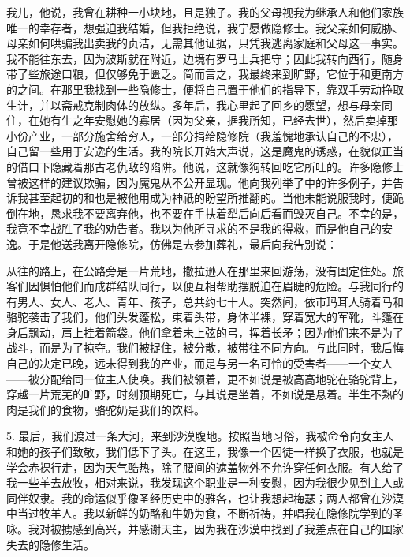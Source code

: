 我儿，他说，我曾在耕种一小块地，且是独子。我的父母视我为继承人和他们家族唯一的幸存者，想强迫我结婚，但我拒绝说，我宁愿做隐修士。我父亲如何威胁、母亲如何哄骗我出卖我的贞洁，无需其他证据，只凭我逃离家庭和父母这一事实。我不能往东去，因为波斯就在附近，边境有罗马士兵把守；因此我转向西行，随身带了些旅途口粮，但仅够免于匮乏。简而言之，我最终来到旷野，它位于和更南方的之间。在那里我找到一些隐修士，便将自己置于他们的指导下，靠双手劳动挣取生计，并以斋戒克制肉体的放纵。多年后，我心里起了回乡的愿望，想与母亲同住，在她有生之年安慰她的寡居（因为父亲，据我所知，已经去世），然后卖掉那小份产业，一部分施舍给穷人，一部分捐给隐修院（我羞愧地承认自己的不忠），自己留一些用于安逸的生活。我的院长开始大声说，这是魔鬼的诱惑，在貌似正当的借口下隐藏着那古老仇敌的陷阱。他说，这就像狗转回吃它所吐的。许多隐修士曾被这样的建议欺骗，因为魔鬼从不公开显现。他向我列举了中的许多例子，并告诉我甚至起初的和也是被他用成为神祇的盼望所推翻的。当他未能说服我时，便跪倒在地，恳求我不要离弃他，也不要在手扶着犁后向后看而毁灭自己。不幸的是，我竟不幸战胜了我的劝告者。我以为他所寻求的不是我的得救，而是他自己的安逸。于是他送我离开隐修院，仿佛是去参加葬礼，最后向我告别说：\par

从往的路上，在公路旁是一片荒地，撒拉逊人在那里来回游荡，没有固定住处。旅客们因惧怕他们而成群结队同行，以便互相帮助摆脱迫在眉睫的危险。与我同行的有男人、女人、老人、青年、孩子，总共约七十人。突然间，依市玛耳人骑着马和骆驼袭击了我们，他们头发蓬松，束着头带，身体半裸，穿着宽大的军靴，斗篷在身后飘动，肩上挂着箭袋。他们拿着未上弦的弓，挥着长矛；因为他们来不是为了战斗，而是为了掠夺。我们被捉住，被分散，被带往不同方向。与此同时，我后悔自己的决定已晚，远未得到我的产业，而是与另一名可怜的受害者——一个女人——被分配给同一位主人使唤。我们被领着，更不如说是被高高地驼在骆驼背上，穿越一片荒芜的旷野，时刻预期死亡，与其说是坐着，不如说是悬着。半生不熟的肉是我们的食物，骆驼奶是我们的饮料。\par

5. 最后，我们渡过一条大河，来到沙漠腹地。按照当地习俗，我被命令向女主人和她的孩子们致敬，我们低下了头。在这里，我像一个囚徒一样换了衣服，也就是学会赤裸行走，因为天气酷热，除了腰间的遮盖物外不允许穿任何衣服。有人给了我一些羊去放牧，相对来说，我发现这个职业是一种安慰，因为我很少见到主人或同伴奴隶。我的命运似乎像圣经历史中的雅各，也让我想起梅瑟；两人都曾在沙漠中当过牧羊人。我以新鲜的奶酪和牛奶为食，不断祈祷，并唱我在隐修院学到的圣咏。我对被掳感到高兴，并感谢天主，因为我在沙漠中找到了我差点在自己的国家失去的隐修生活。\par

